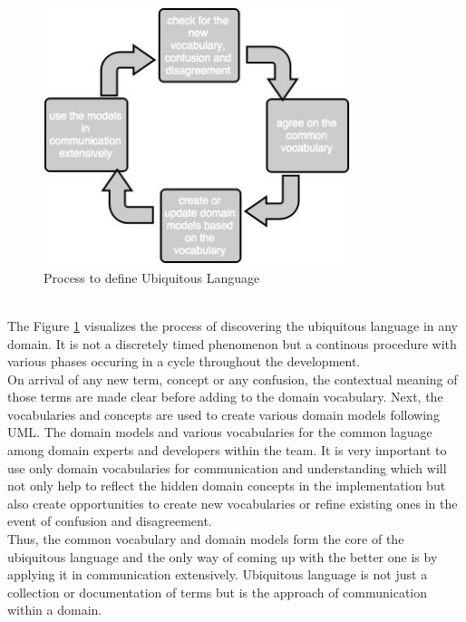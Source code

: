 \begin{figure}[H]
\begin{center}
\includegraphics[width=0.8\textwidth]{figures/domain-driven-design-one}
\caption{Process to define Ubiquitous Language \cite{Evans:2003aa}}
\label{fig:domain_driven_design/ubiquitous_language_process}
\end{center}
\end{figure}
\\
The Figure \ref{fig:domain_driven_design/ubiquitous_language_process} visualizes the process of discovering the ubiquitous language in any domain. It is not a discretely timed phenomenon but a continous procedure with various phases occuring in a cycle throughout the development.
\\
On arrival of any new term, concept or any confusion, the contextual meaning of those terms are made clear before adding to the domain vocabulary. Next, the vocabularies and concepts are used to create various domain models following \acrshort{UML}. The domain models and various vocabularies for the common laguage among domain experts and developers within the team. It is very important to use only domain vocabularies for communication and understanding which will not only help to reflect the hidden domain concepts in the implementation but also create opportunities to create new vocabularies or refine existing ones in the event of confusion and disagreement.\cite{Evans:2003aa}
\\
Thus, the common vocabulary and domain models form the core of the ubiquitous language and the only way of coming up with the better one is by applying it in communication extensively. Ubiquitous language is not just a collection or documentation of terms but is the approach of communication within a domain.
\\
